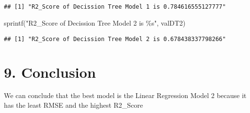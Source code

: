 \documentclass[
]{article}
\newenvironment{Shaded}{\begin{snugshade}}{\end{snugshade}}
\newcommand{\FunctionTok}[1]{\textcolor[rgb]{0.00,0.00,0.00}{#1}}
\newcommand{\NormalTok}[1]{#1}
\newcommand{\StringTok}[1]{\textcolor[rgb]{0.31,0.60,0.02}{#1}}
\begin{document}
\begin{verbatim}
## [1] "R2_Score of Decission Tree Model 1 is 0.784616555127777"
\end{verbatim}

\begin{Shaded}
\begin{Highlighting}[]
\FunctionTok{sprintf}\NormalTok{(}\StringTok{"R2\_Score of Decission Tree Model 2 is \%s"}\NormalTok{, valDT2)}
\end{Highlighting}
\end{Shaded}

\begin{verbatim}
## [1] "R2_Score of Decission Tree Model 2 is 0.678438337798266"
\end{verbatim}

\hypertarget{conclusion}{%
\section{9. Conclusion}\label{conclusion}}

We can conclude that the best model is the Linear Regression Model 2
because it has the least RMSE and the highest R2\_Score
\end{document}
